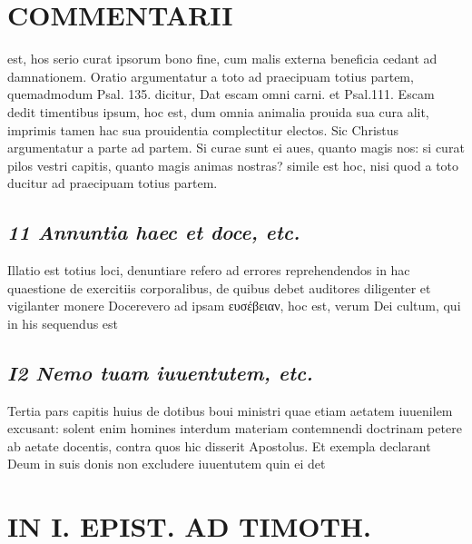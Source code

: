 \documentclass{article}
\begin{document}
\begin{pages}
\section*{COMMENTARII }
\marginpar{[ p.104 ]}\pstart est, hos serio curat ipsorum bono fine, cum malis externa beneficia cedant ad damnationem. Oratio argumentatur a toto ad praecipuam totius partem, quemadmodum Psal. 135. dicitur, Dat escam omni carni. et Psal.111. Escam dedit timentibus ipsum, hoc est, dum omnia animalia prouida sua cura alit, imprimis tamen hac sua prouidentia complectitur electos. Sic Christus argumentatur a parte ad partem. Si curae sunt ei aues, quanto magis nos: si curat pilos vestri capitis, quanto magis animas nostras? simile est hoc, nisi quod a toto ducitur ad praecipuam totius partem.  \pend
{}
{}
\subsection*{\textit{11 Annuntia haec et doce, etc. }}\pstart Illatio est totius loci, denuntiare refero ad errores reprehendendos in hac quaestione de exercitiis corporalibus, de quibus debet auditores diligenter et vigilanter monere  \pend\pstart Docerevero ad ipsam ευσέβειαν, hoc est, verum Dei cultum, qui in his sequendus est  \pend
{}
{}
\subsection*{\textit{I2 Nemo tuam iuuentutem, etc. }}\pstart Tertia pars capitis huius de dotibus boui ministri quae etiam aetatem iuuenilem excusant: solent enim homines interdum materiam contemnendi doctrinam petere ab aetate docentis, contra quos hic disserit Apostolus. Et exempla declarant Deum in suis donis non excludere iuuentutem quin ei det  \pend
\section*{IN I. EPIST. AD TIMOTH. }
\marginpar{[ p.105 ]}
{}

\end{pages}
\end{document}
